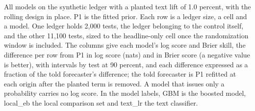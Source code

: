 \begin{table}[t]\centering\scriptsize
\caption{All models on the synthetic ledger with a planted text lift of 1.0 percent, with the rolling design in place. P1 is the fitted prior. Each row is a ledger size, a cell and a model. One ledger holds 2,000 tests, the ledger belonging to the control itself, and the other 11,100 tests, sized to the headline-only cell once the randomization window is included. The columns give each model's log score and Brier skill, the difference per row from P1 in log score (nats) and in Brier score (a negative value is better), with intervals by test at 90 percent, and each difference expressed as a fraction of the told forecaster's difference; the told forecaster is P1 refitted at each origin after the planted term is removed. A model that issues only a probability carries no log score. In the model labels, GBM is the boosted model, local\_eb the local comparison set and text\_lr the text classifier.}
\label{tab:positive-control-rungs}
\resizebox{\textwidth}{!}{}
\end{table}

